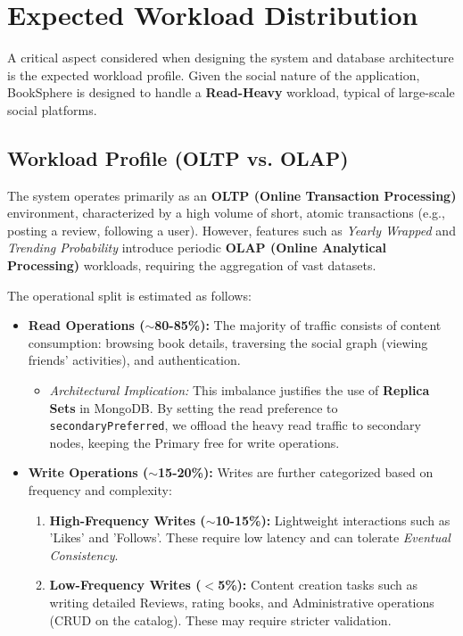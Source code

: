 \section{Expected Workload Distribution}
\label{sec:workload_distribution}

A critical aspect considered when designing the system and database architecture is the expected workload profile. Given the social nature of the application, BookSphere is designed to handle a \textbf{Read-Heavy} workload, typical of large-scale social platforms.

\subsection{Workload Profile (OLTP vs. OLAP)}
The system operates primarily as an \textbf{OLTP (Online Transaction Processing)} environment, characterized by a high volume of short, atomic transactions (e.g., posting a review, following a user). However, features such as \textit{Yearly Wrapped} and \textit{Trending Probability} introduce periodic \textbf{OLAP (Online Analytical Processing)} workloads, requiring the aggregation of vast datasets.

The operational split is estimated as follows:

\begin{itemize}
    \item \textbf{Read Operations ($\sim$80-85\%):}
    The majority of traffic consists of content consumption: browsing book details, traversing the social graph (viewing friends' activities), and authentication.
    \begin{itemize}
        \item \textit{Architectural Implication:} This imbalance justifies the use of \textbf{Replica Sets} in MongoDB. By setting the read preference to \texttt{secondaryPreferred}, we offload the heavy read traffic to secondary nodes, keeping the Primary free for write operations.
    \end{itemize}

    \item \textbf{Write Operations ($\sim$15-20\%):}
    Writes are further categorized based on frequency and complexity:
    \begin{enumerate}
        \item \textbf{High-Frequency Writes ($\sim$10-15\%):} Lightweight interactions such as 'Likes' and 'Follows'. These require low latency and can tolerate \textit{Eventual Consistency}.
        \item \textbf{Low-Frequency Writes ($<$5\%):} Content creation tasks such as writing detailed Reviews, rating books, and Administrative operations (CRUD on the catalog). These may require stricter validation.
    \end{enumerate}
\end{itemize}

